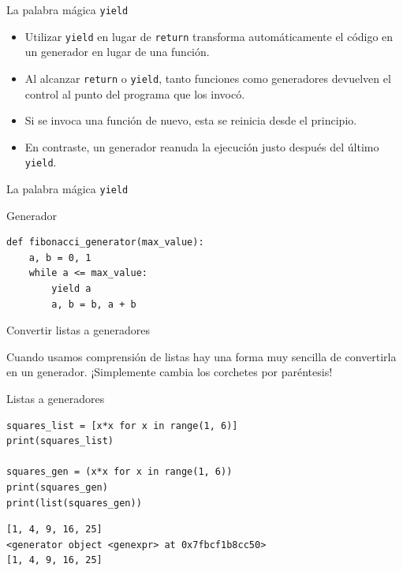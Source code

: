 \documentclass[11pt]{beamer}
\begin{document}
\begin{frame}{La palabra mágica \texttt{yield}}
    \begin{itemize}
        \item Utilizar \texttt{yield} en lugar de \texttt{return} transforma automáticamente el código en un generador en lugar de una función.
        \item Al alcanzar \texttt{return} o \texttt{yield}, tanto funciones como generadores devuelven el control al punto del programa que los invocó.
        \item Si se invoca una función de nuevo, esta se reinicia desde el principio.
        \item En contraste, un generador reanuda la ejecución justo después del último \texttt{yield}.
    \end{itemize}
\end{frame}

\begin{frame}[fragile]{La palabra mágica \texttt{yield}}
\begin{block}{Generador}
\begin{verbatim}
def fibonacci_generator(max_value):
    a, b = 0, 1
    while a <= max_value:
        yield a
        a, b = b, a + b
\end{verbatim}
\end{block} 
\end{frame}

\begin{frame}[fragile]{Convertir listas a generadores}

\begin{center}
   Cuando usamos comprensión de listas hay una forma muy sencilla de convertirla en un generador. ¡Simplemente cambia los corchetes por paréntesis! 
\end{center}

\begin{block}{Listas a generadores}
\begin{verbatim}
squares_list = [x*x for x in range(1, 6)]
print(squares_list)

squares_gen = (x*x for x in range(1, 6))
print(squares_gen)
print(list(squares_gen))
\end{verbatim}

\begin{verbatim}
[1, 4, 9, 16, 25]
<generator object <genexpr> at 0x7fbcf1b8cc50>
[1, 4, 9, 16, 25]   
\end{verbatim}
\end{block} 
\end{frame}
\end{document}
